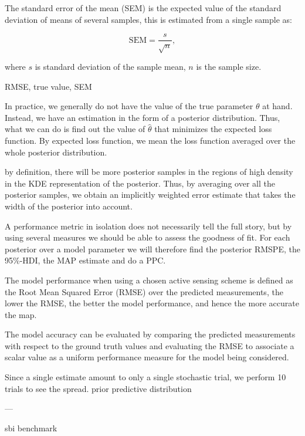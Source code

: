 The standard error of the mean (SEM) is the expected value of the standard deviation of means of several samples, this is estimated from a single sample as: 

\begin{equation}
    \mathrm{SEM} = \frac{s}{\sqrt{n}},
\end{equation}

where $s$ is standard deviation of the sample mean, $n$ is the sample size.

RMSE, true value, SEM 

In practice, we generally do not have the value of the true parameter $\theta$ at hand. Instead, we have an estimation in the form of a posterior distribution. Thus, what we can do is find out the value of $\hat{\theta}$ that minimizes the expected loss function. By expected loss function, we mean the loss function averaged over the whole posterior distribution. 


by definition, there will be more posterior samples in the regions of high density in the KDE representation of the posterior. Thus, by averaging over all the posterior samples, we obtain an implicitly weighted error estimate that takes the width of the posterior into account. 

A performance metric in isolation does not necessarily tell the full story, but by using several measures we should be able to assess the goodness of fit. For each posterior over a model parameter we will therefore find the posterior RMSPE, the 95\%-HDI, the MAP estimate and do a PPC.

The model performance when using a chosen active sensing scheme is defined as the Root Mean Squared Error (RMSE) over the predicted measurements, the lower the RMSE, the better the model performance, and hence the more accurate the map.

The model accuracy can be evaluated by comparing the predicted measurements with respect to the ground truth values and evaluating the RMSE to associate a scalar value as a uniform performance measure for the model being considered.


Since a single estimate amount to only a single stochastic trial, we perform 10 trials to see the spread. prior predictive distribution 

---

sbi benchmark 


